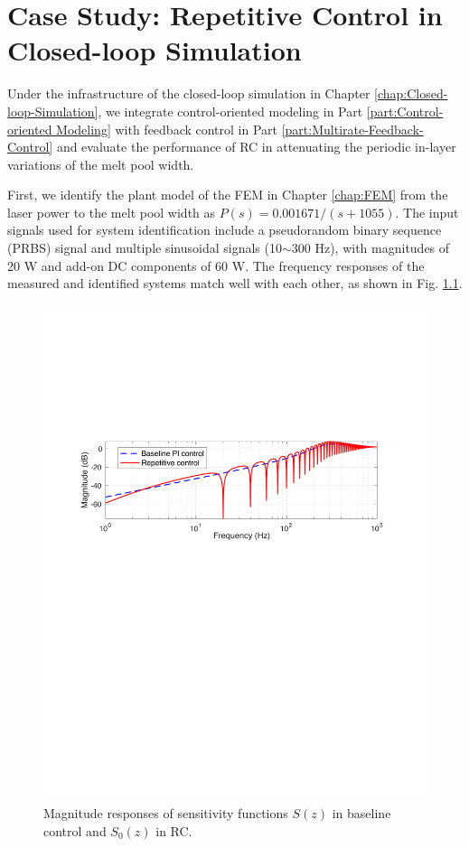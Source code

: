 \documentclass [11pt, proquest] {uwthesis}[2020/02/24]
\begin{document}
\chapter{Case Study: Repetitive Control in Closed-loop Simulation} \label{chap:RC-Closed-loop-Simulation}

Under the infrastructure of the closed-loop simulation in Chapter \ref{chap:Closed-loop-Simulation}, we integrate control-oriented modeling in Part \ref{part:Control-oriented Modeling} with feedback control in Part \ref{part:Multirate-Feedback-Control} and evaluate
the performance of RC in attenuating the periodic in-layer variations
of the melt pool width.

First, we identify the plant model of the FEM in Chapter \ref{chap:FEM}
from the laser power to the melt pool width as $P(s)=0.001671/(s+1055)$.
The input signals used for system identification include a pseudorandom
binary sequence (PRBS) signal and multiple sinusoidal signals (10$\sim$300
Hz), with magnitudes of 20 W and add-on DC components of 60 W. The
frequency responses of the measured and identified systems match well
with each other, as shown in Fig. \ref{fig:Magnitude-responses-of-3}.

\begin{figure}[!ht]
\begin{centering}
\includegraphics[clip,width=13cm]{Closed-loop-simulation/Sensitivity_func_baseline_rc}
\par\end{centering}
\centering{}\caption{\label{fig:Magnitude-responses-of-3}Magnitude responses of sensitivity
functions $S(z)$ in baseline control and $S_{0}(z)$ in RC.}
\end{figure}
\end{document}
